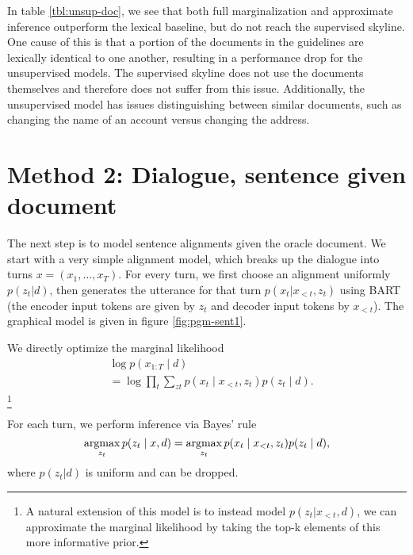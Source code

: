 \documentclass[11pt]{article}
\begin{document}
In table \ref{tbl:unsup-doc}, we see that both full marginalization and approximate inference
outperform the lexical baseline, but do not reach the supervised skyline.
One cause of this is that a portion of the documents in the guidelines are lexically identical to one
another, resulting in a performance drop for the unsupervised models.
The supervised skyline does not use the documents themselves and therefore does not
suffer from this issue.
Additionally, the unsupervised model has issues distinguishing between similar
documents, such as changing the name of an account versus changing the address.

\section{Method 2: Dialogue, sentence given document}
The next step is to model sentence alignments given the oracle document.
We start with a very simple alignment model,
which breaks up the dialogue into turns $x = (x_1,\ldots,x_T)$.
For every turn, we first choose an alignment uniformly $p(z_t|d)$,
then generates the utterance for that turn $p(x_t|x_{<t}, z_t)$ using BART
(the encoder input tokens are given by $z_t$ and decoder input tokens by $x_{<t}$).
The graphical model is given in figure \ref{fig:pgm-sent1}.

We directly optimize the marginal likelihood
\begin{equation}
\begin{aligned}
&\log p(x_{1:T}\mid d)\\
&= \log \prod_t \sum_{zt} p(x_t \mid x_{<t}, z_t) p(z_t\mid d).
\end{aligned}
\end{equation}
\footnote{A natural extension of this model is to instead model $p(z_t|x_{<t},d)$,
we can approximate the marginal likelihood by taking the top-k elements of this
more informative prior.}

For each turn, we perform inference via Bayes' rule
\begin{equation}
\operatorname*{argmax}_{z_t} p(z_t \mid x, d) = \operatorname*{argmax}_{z_t} p(x_t \mid x_{<t}, z_t)p(z_t\mid d),
\end{equation}
where $p(z_t|d)$ is uniform and can be dropped.
\end{document}
